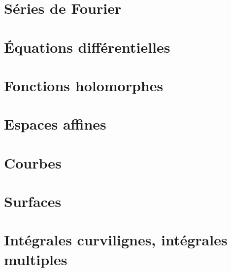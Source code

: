 \documentclass{MathBook}
\begin{document}
\chapter{ Séries de Fourier }





\chapter{Équations différentielles }
\chapter{Fonctions holomorphes}

\chapter{Espaces affines }
\chapter{ Courbes }
\chapter{Surfaces }
\chapter{ Intégrales curvilignes, intégrales multiples }
\end{document}
